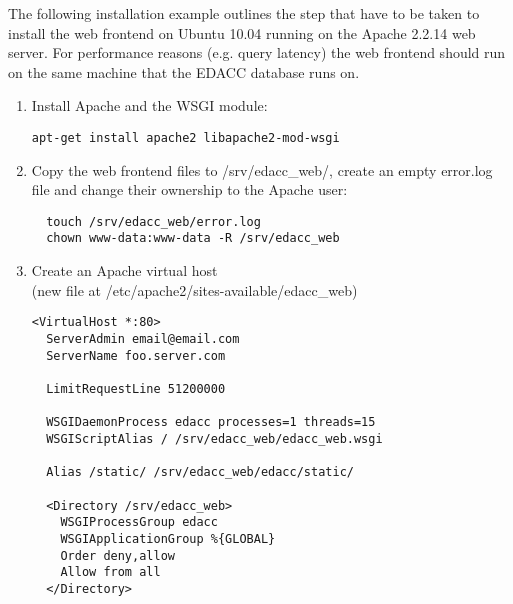 The following installation example outlines the step that have to be taken to install the web frontend on Ubuntu 10.04
running on the Apache 2.2.14 web server. For performance reasons (e.g. query latency) the web frontend should run on the
same machine that the EDACC database runs on.
\marginlabel{\Eexample}
\begin{enumerate}
\item Install Apache and the WSGI module: \begin{verbatim}apt-get install apache2 libapache2-mod-wsgi\end{verbatim}
\item{ Copy the web frontend files to /srv/edacc\_web/, create an empty error.log file and change their ownership to the Apache user: 
\begin{verbatim}
  touch /srv/edacc_web/error.log
  chown www-data:www-data -R /srv/edacc_web
\end{verbatim}
}
\item{ Create an Apache virtual host\\
(new file at /etc/apache2/sites-available/edacc\_web)
\begin{verbatim}
<VirtualHost *:80>
  ServerAdmin email@email.com
  ServerName foo.server.com

  LimitRequestLine 51200000

  WSGIDaemonProcess edacc processes=1 threads=15
  WSGIScriptAlias / /srv/edacc_web/edacc_web.wsgi

  Alias /static/ /srv/edacc_web/edacc/static/

  <Directory /srv/edacc_web>
    WSGIProcessGroup edacc
    WSGIApplicationGroup %{GLOBAL}
    Order deny,allow
    Allow from all
  </Directory>


\end{verbatim}}
\end{enumerate}
